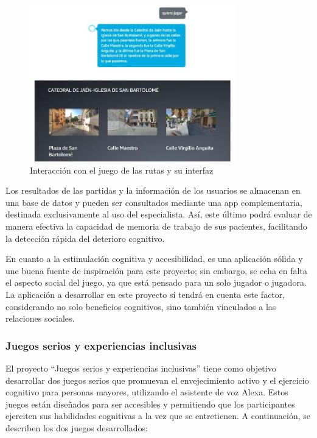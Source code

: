 \begin{figure}[H]
	\centering
	\includegraphics[width=0.8\textwidth]{imgs/tfg-caminos-2.JPG}
	\caption{Interacción con el juego de las rutas y su interfaz}
	\label{fig:tfg-caminos-2}
\end{figure}

Los resultados de las partidas y la información de los usuarios se almacenan en una base de datos y pueden ser consultados mediante una app complementaria, destinada exclusivamente al uso del especialista. Así, este último podrá evaluar de manera efectiva la capacidad de memoria de trabajo de sus pacientes, facilitando la detección rápida del deterioro cognitivo.

En cuanto a la estimulación cognitiva y accesibilidad, es una aplicación sólida y une buena fuente de inspiración para este proyecto; sin embargo, se echa en falta el aspecto social del juego, ya que está pensado para un solo jugador o jugadora. La aplicación a desarrollar en este proyecto sí tendrá en cuenta este factor, considerando no solo beneficios cognitivos, sino también vinculados a las relaciones sociales.

\subsubsection{Juegos serios y experiencias inclusivas}

El proyecto \enquote{Juegos serios y experiencias inclusivas} \parencite{tfgAlexa4} tiene como objetivo desarrollar dos juegos serios que promuevan el envejecimiento activo y el ejercicio cognitivo para personas mayores, utilizando el asistente de voz Alexa. Estos juegos están diseñados para ser accesibles y permitiendo que los participantes ejerciten sus habilidades cognitivas a la vez que se entretienen. A continuación, se describen los dos juegos desarrollados:

